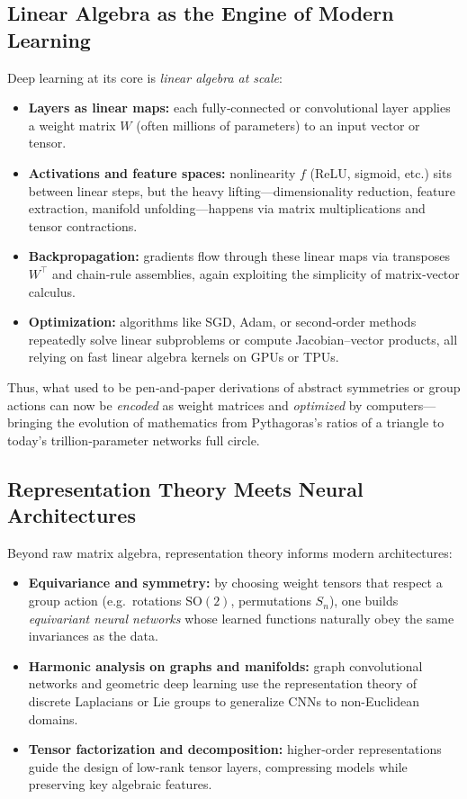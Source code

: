 \subsection{Linear Algebra as the Engine of Modern Learning}
Deep learning at its core is \emph{linear algebra at scale}:
\begin{itemize}
  \item \textbf{Layers as linear maps:} each fully‐connected or convolutional layer applies a weight matrix \(W\) (often millions of parameters) to an input vector or tensor.
  \item \textbf{Activations and feature spaces:} nonlinearity \(f\) (ReLU, sigmoid, etc.) sits between linear steps, but the heavy lifting—dimensionality reduction, feature extraction, manifold unfolding—happens via matrix multiplications and tensor contractions.
  \item \textbf{Backpropagation:} gradients flow through these linear maps via transposes \(W^\top\) and chain‐rule assemblies, again exploiting the simplicity of matrix‐vector calculus.
  \item \textbf{Optimization:} algorithms like SGD, Adam, or second‐order methods repeatedly solve linear subproblems or compute Jacobian–vector products, all relying on fast linear algebra kernels on GPUs or TPUs.
\end{itemize}

Thus, what used to be pen‐and‐paper derivations of abstract symmetries or group actions can now be \emph{encoded} as weight matrices and \emph{optimized} by computers—bringing the evolution of mathematics from Pythagoras’s ratios of a triangle to today’s trillion‐parameter networks full circle.





\subsection{Representation Theory Meets Neural Architectures}
Beyond raw matrix algebra, representation theory informs modern architectures:
\begin{itemize}
  \item \textbf{Equivariance and symmetry:} by choosing weight tensors that respect a group action (e.g.\ rotations \(\mathrm{SO}(2)\), permutations \(S_n\)), one builds \emph{equivariant neural networks} whose learned functions naturally obey the same invariances as the data.
  \item \textbf{Harmonic analysis on graphs and manifolds:} graph convolutional networks and geometric deep learning use the representation theory of discrete Laplacians or Lie groups to generalize CNNs to non-Euclidean domains.
  \item \textbf{Tensor factorization and decomposition:} higher‐order representations guide the design of low-rank tensor layers, compressing models while preserving key algebraic features.
\end{itemize}

